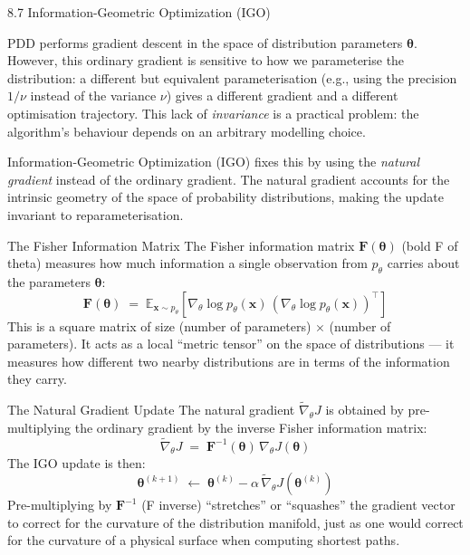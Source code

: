 \documentclass[aspectratio=169,10pt]{beamer}
\begin{document}
\begin{frame}[allowframebreaks]{8.7 Information-Geometric Optimization (IGO)}

PDD performs gradient descent in the space of distribution parameters $\bm{\theta}$.
However, this ordinary gradient is sensitive to how we parameterise the distribution: a different but equivalent parameterisation (e.g., using the precision $1/\nu$ instead of the variance $\nu$) gives a different gradient and a different optimisation trajectory.
This lack of \emph{invariance} is a practical problem: the algorithm's behaviour depends on an arbitrary modelling choice.

Information-Geometric Optimization (IGO) fixes this by using the \emph{natural gradient} instead of the ordinary gradient.
The natural gradient accounts for the intrinsic geometry of the space of probability distributions, making the update invariant to reparameterisation.

\begin{block}{The Fisher Information Matrix}
The Fisher information matrix $\mathbf{F}(\bm{\theta})$ (bold F of theta) measures how much information a single observation from $p_\theta$ carries about the parameters $\bm{\theta}$:
\[
  \mathbf{F}(\bm{\theta}) \;=\; \mathbb{E}_{\mathbf{x} \sim p_\theta}\!\left[\nabla_\theta \log p_\theta(\mathbf{x})\,\left(\nabla_\theta \log p_\theta(\mathbf{x})\right)^\top\right]
\]
This is a square matrix of size (number of parameters) $\times$ (number of parameters). It acts as a local ``metric tensor'' on the space of distributions --- it measures how different two nearby distributions are in terms of the information they carry.
\end{block}

\begin{block}{The Natural Gradient Update}
The natural gradient $\tilde{\nabla}_\theta J$ is obtained by pre-multiplying the ordinary gradient by the inverse Fisher information matrix:
\[
  \tilde{\nabla}_\theta J \;=\; \mathbf{F}^{-1}(\bm{\theta})\,\nabla_\theta J(\bm{\theta})
\]
The IGO update is then:
\[
  \bm{\theta}^{(k+1)} \;\leftarrow\; \bm{\theta}^{(k)} - \alpha\,\tilde{\nabla}_\theta J(\bm{\theta}^{(k)})
\]
Pre-multiplying by $\mathbf{F}^{-1}$ (F inverse) ``stretches'' or ``squashes'' the gradient vector to correct for the curvature of the distribution manifold, just as one would correct for the curvature of a physical surface when computing shortest paths.
\end{block}


\end{frame}
\end{document}
